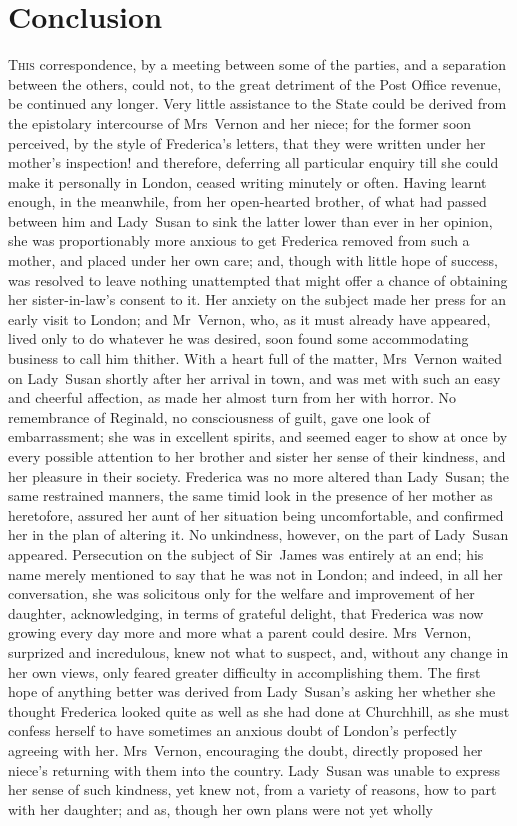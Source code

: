 \chapter{Conclusion} 

\lettrine[lraise=0.3]{T}{his} correspondence, by a meeting between some of the parties, and a separation between the others, could not, to the great detriment of the Post Office revenue, be continued any longer. Very little assistance to the State could be derived from the epistolary intercourse of Mrs~Vernon and her niece; for the former soon perceived, by the style of Frederica's letters, that they were written under her mother's inspection! and therefore, deferring all particular enquiry till she could make it personally in London, ceased writing minutely or often. Having learnt enough, in the meanwhile, from her open-hearted brother, of what had passed between him and Lady~Susan to sink the latter lower than ever in her opinion, she was proportionably more anxious to get Frederica removed from such a mother, and placed under her own care; and, though with little hope of success, was resolved to leave nothing unattempted that might offer a chance of obtaining her sister-in-law's consent to it. Her anxiety on the subject made her press for an early visit to London; and Mr~Vernon, who, as it must already have appeared, lived only to do whatever he was desired, soon found some accommodating business to call him thither. With a heart full of the matter, Mrs~Vernon waited on Lady~Susan shortly after her arrival in town, and was met with such an easy and cheerful affection, as made her almost turn from her with horror. No remembrance of Reginald, no consciousness of guilt, gave one look of embarrassment; she was in excellent spirits, and seemed eager to show at once by every possible attention to her brother and sister her sense of their kindness, and her pleasure in their society. Frederica was no more altered than Lady~Susan; the same restrained manners, the same timid look in the presence of her mother as heretofore, assured her aunt of her situation being uncomfortable, and confirmed her in the plan of altering it. No unkindness, however, on the part of Lady~Susan appeared. Persecution on the subject of Sir~James was entirely at an end; his name merely mentioned to say that he was not in London; and indeed, in all her conversation, she was solicitous only for the welfare and improvement of her daughter, acknowledging, in terms of grateful delight, that Frederica was now growing every day more and more what a parent could desire. Mrs~Vernon, surprized and incredulous, knew not what to suspect, and, without any change in her own views, only feared greater difficulty in accomplishing them. The first hope of anything better was derived from Lady~Susan's asking her whether she thought Frederica looked quite as well as she had done at Churchhill, as she must confess herself to have sometimes an anxious doubt of London's perfectly agreeing with her. Mrs~Vernon, encouraging the doubt, directly proposed her niece's returning with them into the country. Lady~Susan was unable to express her sense of such kindness, yet knew not, from a variety of reasons, how to part with her daughter; and as, though her own plans were not yet wholly 
